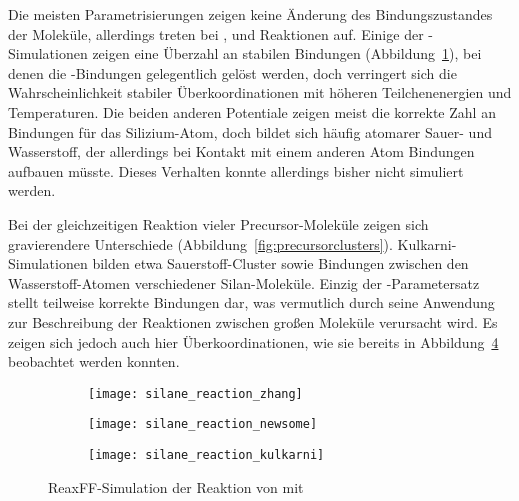 Die meisten Parametrisierungen zeigen keine Änderung des Bindungszustandes der Moleküle, allerdings treten bei ,  und  Reaktionen auf.
Einige der -Simulationen zeigen eine Überzahl an stabilen Bindungen (Abbildung~\ref{fig:zhangreaction}), bei denen die -Bindungen gelegentlich gelöst werden, doch verringert sich die Wahrscheinlichkeit stabiler Überkoordinationen mit höheren Teilchenenergien und Temperaturen.
Die beiden anderen Potentiale zeigen meist die korrekte Zahl an Bindungen für das Silizium-Atom, doch bildet sich häufig atomarer Sauer- und Wasserstoff, der allerdings bei Kontakt mit einem anderen Atom Bindungen aufbauen müsste.
Dieses Verhalten konnte allerdings bisher nicht simuliert werden.

Bei der gleichzeitigen Reaktion vieler Precursor-Moleküle zeigen sich gravierendere Unterschiede (Abbildung~\ref{fig:precursorclusters}).
Kulkarni-Simulationen bilden etwa Sauerstoff-Cluster sowie Bindungen zwischen den Wasserstoff-Atomen verschiedener Silan-Moleküle.
Einzig der -Parametersatz stellt teilweise korrekte Bindungen dar, was vermutlich durch seine Anwendung zur Beschreibung der Reaktionen zwischen großen Moleküle verursacht wird.
Es zeigen sich jedoch auch hier Überkoordinationen, wie sie bereits in Abbildung~\ref{fig:precursorreactions} beobachtet werden konnten.

\begin{figure}[p]

  \captionsetup[subfigure]{singlelinecheck=false}
  \def\subfigwidth{0.32\textwidth}
  \begin{subfigure}[t]{3cm}
    \texttt{[image: silane\_reaction\_zhang]}
    \label{fig:zhangreaction}
  \end{subfigure}
  \hfill
  \begin{subfigure}[t]{5cm}
    \texttt{[image: silane\_reaction\_newsome]}
    \label{fig:newsomereaction}
  \end{subfigure}
  \hfill
  \begin{subfigure}[t]{4.5cm}
    \texttt{[image: silane\_reaction\_kulkarni]}
    \label{fig:kulkarnireaction}
  \end{subfigure}

  \caption{ReaxFF-Simulation der Reaktion von  mit 
  }
  \label{fig:precursorreactions}

\end{figure}

